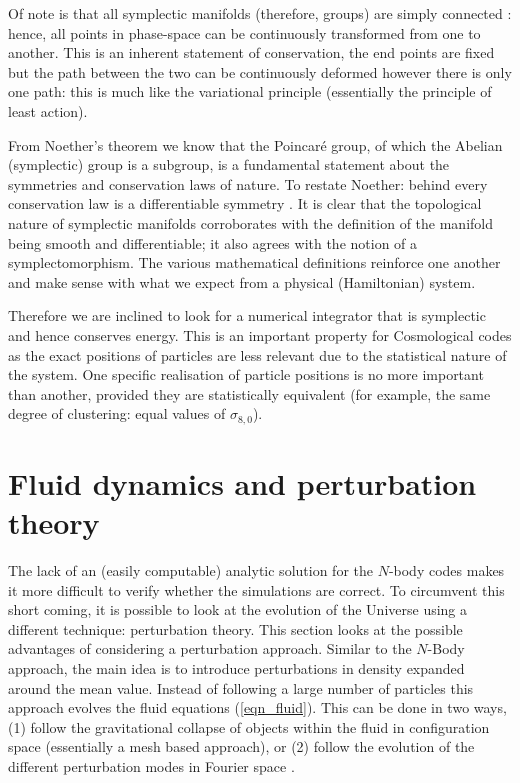 Of note is that all symplectic manifolds (therefore, groups) are simply connected \citep{bib_weyl2}: hence, all points in phase-space can be continuously transformed from one to another. This is an inherent statement of conservation, the end points are fixed but the path between the two can be continuously deformed however there is only one path: this is much like the variational principle (essentially the principle of least action).

From Noether's theorem we know that the Poincar\'e group, of which the Abelian (symplectic) group is a subgroup, is a fundamental statement about the symmetries and conservation laws of nature. To restate Noether: behind every conservation law is a differentiable symmetry \citep{bib_noe}. It is clear that the topological nature of symplectic manifolds corroborates with the definition of the manifold being smooth and differentiable; it also agrees with the notion of a symplectomorphism. The various mathematical definitions reinforce one another and make sense with what we expect from a physical (Hamiltonian) system. \citep{bib_duff}

Therefore we are inclined to look for a numerical integrator that is symplectic and hence conserves energy. This is an important property for Cosmological codes as the exact positions of particles are less relevant due to the statistical nature of the system. One specific realisation of particle positions is no more important than another, provided they are statistically equivalent (for example, the same degree of clustering: equal values of $\sigma_{8,0}$).

\section{Fluid dynamics and perturbation theory}
\label{sec_pert}
The lack of an (easily computable) analytic solution for the $N$-body codes makes it more difficult to verify whether the simulations are correct. To circumvent this short coming, it is possible to look at the evolution of the Universe using a different technique: perturbation theory. This section looks at the possible advantages of considering a perturbation approach. Similar to the $N$-Body approach, the main idea is to introduce perturbations in density expanded around the mean value. Instead of following a large number of particles this approach evolves the fluid equations (\ref{eqn_fluid}). This can be done in two ways, (1) follow the gravitational collapse of objects within the fluid in configuration space (essentially a mesh based approach), or (2) follow the evolution of the different perturbation modes in Fourier space \citep{bib_mab, bib_huw, bib_cmb, bib_cmb2}.

